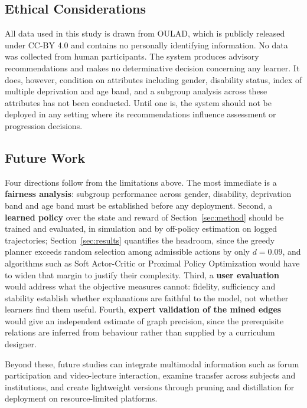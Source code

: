 \subsection{Ethical Considerations}

All data used in this study is drawn from OULAD, which is publicly released under CC-BY
4.0 and contains no personally identifying information. No data was collected from human
participants. The system produces advisory recommendations and makes no determinative
decision concerning any learner. It does, however, condition on attributes including
gender, disability status, index of multiple deprivation and age band, and a subgroup
analysis across these attributes has not been conducted. Until one is, the system should
not be deployed in any setting where its recommendations influence assessment or
progression decisions.

\subsection{Future Work}

Four directions follow from the limitations above. The most immediate is a \textbf{fairness
analysis}: subgroup performance across gender, disability, deprivation band and age band
must be established before any deployment. Second, a \textbf{learned policy} over the state
and reward of Section~\ref{sec:method} should be trained and evaluated, in simulation and
by off-policy estimation on logged trajectories; Section~\ref{sec:results} quantifies the
headroom, since the greedy planner exceeds random selection among admissible actions by
only $d = 0.09$, and algorithms such as Soft Actor-Critic or Proximal Policy Optimization
would have to widen that margin to justify their complexity. Third, a \textbf{user
evaluation} would address what the objective measures cannot: fidelity, sufficiency and
stability establish whether explanations are faithful to the model, not whether learners
find them useful. Fourth, \textbf{expert validation of the mined edges} would give an
independent estimate of graph precision, since the prerequisite relations are inferred
from behaviour rather than supplied by a curriculum designer.

Beyond these, future studies can integrate multimodal information such as forum
participation and video-lecture interaction, examine transfer across subjects and
institutions, and create lightweight versions through pruning and distillation for
deployment on resource-limited platforms.

